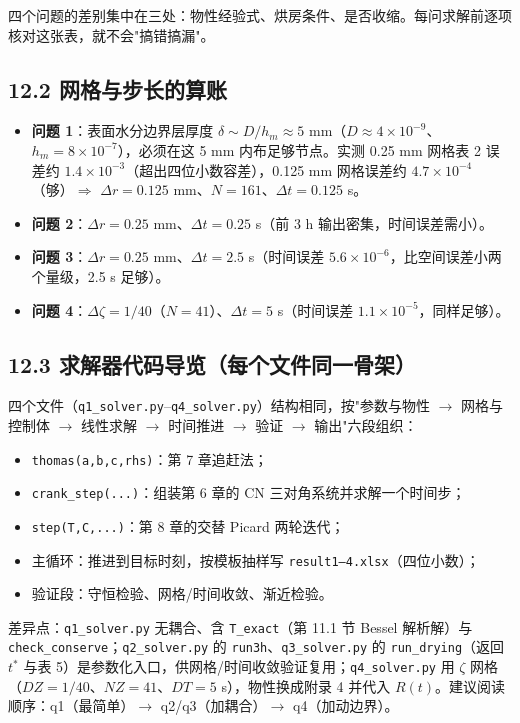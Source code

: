 \documentclass[12pt,a4paper]{ctexart}
\begin{document}
四个问题的差别集中在三处：物性经验式、烘房条件、是否收缩。每问求解前逐项核对这张表，就不会"搞错搞漏"。

\subsection{12.2 网格与步长的算账}

\begin{itemize}[leftmargin=2em]
\item \textbf{问题 1}：表面水分边界层厚度 $\delta\sim D/h_m\approx5$ mm（$D\approx4\times10^{-9}$、$h_m=8\times10^{-7}$），必须在这 5 mm 内布足够节点。实测 0.25 mm 网格表 2 误差约 $1.4\times10^{-3}$（超出四位小数容差），0.125 mm 网格误差约 $4.7\times10^{-4}$（够）$\Rightarrow$ $\Delta r=0.125$ mm、$N=161$、$\Delta t=0.125$ s。
\item \textbf{问题 2}：$\Delta r=0.25$ mm、$\Delta t=0.25$ s（前 3 h 输出密集，时间误差需小）。
\item \textbf{问题 3}：$\Delta r=0.25$ mm、$\Delta t=2.5$ s（时间误差 $5.6\times10^{-6}$，比空间误差小两个量级，2.5 s 足够）。
\item \textbf{问题 4}：$\Delta\zeta=1/40$（$N=41$）、$\Delta t=5$ s（时间误差 $1.1\times10^{-5}$，同样足够）。
\end{itemize}

\subsection{12.3 求解器代码导览（每个文件同一骨架）}

四个文件（\texttt{q1\_solver.py}--\texttt{q4\_solver.py}）结构相同，按"参数与物性 $\to$ 网格与控制体 $\to$ 线性求解 $\to$ 时间推进 $\to$ 验证 $\to$ 输出"六段组织：
\begin{itemize}[leftmargin=2em]
\item \texttt{thomas(a,b,c,rhs)}：第 7 章追赶法；
\item \texttt{crank\_step(...)}：组装第 6 章的 CN 三对角系统并求解一个时间步；
\item \texttt{step(T,C,...)}：第 8 章的交替 Picard 两轮迭代；
\item 主循环：推进到目标时刻，按模板抽样写 \texttt{result1--4.xlsx}（四位小数）；
\item 验证段：守恒检验、网格/时间收敛、渐近检验。
\end{itemize}
差异点：\texttt{q1\_solver.py} 无耦合、含 \texttt{T\_exact}（第 11.1 节 Bessel 解析解）与 \texttt{check\_conserve}；\texttt{q2\_solver.py} 的 \texttt{run3h}、\texttt{q3\_solver.py} 的 \texttt{run\_drying}（返回 $t^*$ 与表 5）是参数化入口，供网格/时间收敛验证复用；\texttt{q4\_solver.py} 用 $\zeta$ 网格（$DZ=1/40$、$NZ=41$、$DT=5$ s），物性换成附录 4 并代入 $R(t)$。建议阅读顺序：q1（最简单）$\to$ q2/q3（加耦合）$\to$ q4（加动边界）。
\end{document}

